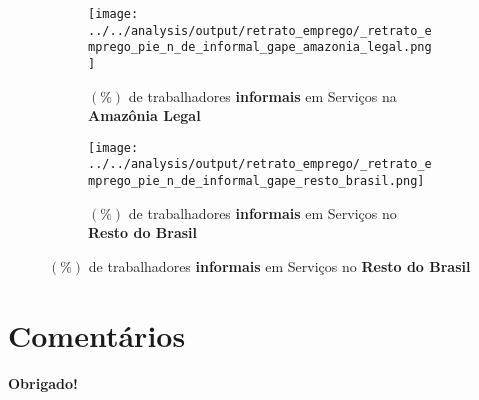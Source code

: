 \documentclass[11pt]{beamer}
\begin{document}
\begin{frame}[label=_retrato_emprego_pie_n_de_informal_gape]{}
\textit{\hyperlink{indice_principal}{}}
\begin{figure}
\centering
\begin{subfigure}{.5\textwidth}
  \centering
  \texttt{[image: ../../analysis/output/retrato\_emprego/\_retrato\_emprego\_pie\_n\_de\_informal\_gape\_amazonia\_legal.png]}
  \label{fig:_retrato_emprego_pie_n_de_informal_gape_amazonia_legal}
  \caption{{\tiny $(\%)$ de trabalhadores \textbf{informais} em Serviços na \textbf{Amazônia Legal}}}
\end{subfigure}%
\begin{subfigure}{.5\textwidth}
  \centering
  \texttt{[image: ../../analysis/output/retrato\_emprego/\_retrato\_emprego\_pie\_n\_de\_informal\_gape\_resto\_brasil.png]}
  \label{fig:_retrato_emprego_pie_n_de_informal_gape_resto_brasil}
   \caption{{\tiny $(\%)$ de trabalhadores \textbf{informais} em Serviços no \textbf{Resto do Brasil}}}
\end{subfigure}
\end{figure}
\end{frame}

\section{Comentários}


\frame
{
    \begin{center}
     \vfill
    \textbf{Obrigado!}
     \\

     \begin{small}
     \end{small}
     \vfill
\end{center}
}
\end{document}
